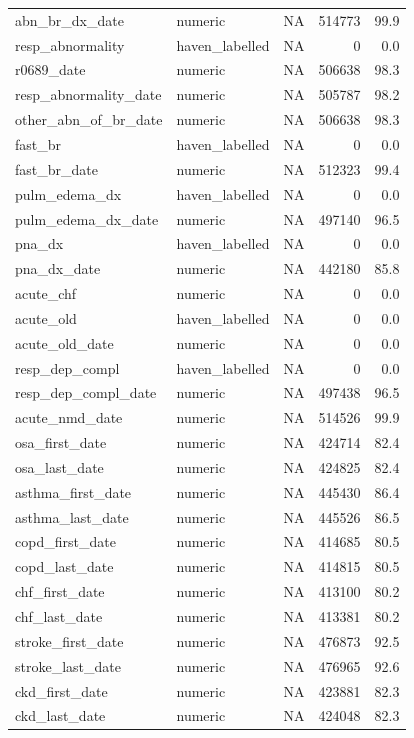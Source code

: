 \documentclass[
  11pt,
  letterpaper,
  DIV=11,
  numbers=noendperiod]{scrartcl}
\begin{document}
\begin{longtable*}{llrrr}
abn\_br\_dx\_date & numeric & NA & 514773 & 99.9\\
resp\_abnormality & haven\_labelled & NA & 0 & 0.0\\
r0689\_date & numeric & NA & 506638 & 98.3\\
resp\_abnormality\_date & numeric & NA & 505787 & 98.2\\
\addlinespace
other\_abn\_of\_br\_date & numeric & NA & 506638 & 98.3\\
fast\_br & haven\_labelled & NA & 0 & 0.0\\
fast\_br\_date & numeric & NA & 512323 & 99.4\\
pulm\_edema\_dx & haven\_labelled & NA & 0 & 0.0\\
pulm\_edema\_dx\_date & numeric & NA & 497140 & 96.5\\
\addlinespace
pna\_dx & haven\_labelled & NA & 0 & 0.0\\
pna\_dx\_date & numeric & NA & 442180 & 85.8\\
acute\_chf & numeric & NA & 0 & 0.0\\
acute\_old & haven\_labelled & NA & 0 & 0.0\\
acute\_old\_date & numeric & NA & 0 & 0.0\\
\addlinespace
resp\_dep\_compl & haven\_labelled & NA & 0 & 0.0\\
resp\_dep\_compl\_date & numeric & NA & 497438 & 96.5\\
acute\_nmd\_date & numeric & NA & 514526 & 99.9\\
osa\_first\_date & numeric & NA & 424714 & 82.4\\
osa\_last\_date & numeric & NA & 424825 & 82.4\\
\addlinespace
asthma\_first\_date & numeric & NA & 445430 & 86.4\\
asthma\_last\_date & numeric & NA & 445526 & 86.5\\
copd\_first\_date & numeric & NA & 414685 & 80.5\\
copd\_last\_date & numeric & NA & 414815 & 80.5\\
chf\_first\_date & numeric & NA & 413100 & 80.2\\
\addlinespace
chf\_last\_date & numeric & NA & 413381 & 80.2\\
stroke\_first\_date & numeric & NA & 476873 & 92.5\\
stroke\_last\_date & numeric & NA & 476965 & 92.6\\
ckd\_first\_date & numeric & NA & 423881 & 82.3\\
ckd\_last\_date & numeric & NA & 424048 & 82.3\\

\end{longtable*}
\end{document}
